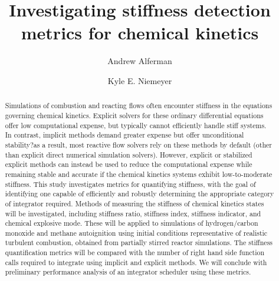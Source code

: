 \documentclass[12pt]{ussci}
\title{ Investigating stiffness detection metrics for chemical kinetics }
\author[1]{Andrew Alferman}
\author[1,*]{Kyle E. Niemeyer}
\affil[1]{School of Mechanical, Industrial, and Manufacturing Engineering\\
		Oregon State University, Corvallis, OR 97331, USA}
\affil[*]{Corresponding author: \email{Kyle.Niemeyer@oregonstate.edu}}
\begin{document}
\maketitle

\begin{abstract} %


Simulations of combustion and reacting flows often encounter stiffness in the equations governing chemical kinetics.
Explicit solvers for these ordinary differential equations offer low computational expense, but typically cannot efficiently handle stiff systems.
In contrast, implicit methods demand greater expense but offer unconditional stability?as a result, most reactive flow solvers rely on these methods by default (other than explicit direct numerical simulation solvers).
However, explicit or stabilized explicit methods can instead be used to reduce the computational expense while remaining stable and accurate if the chemical kinetics systems exhibit low-to-moderate stiffness.
This study investigates metrics for quantifying stiffness, with the goal of identifying one capable of efficiently and robustly determining the appropriate category of integrator required.
Methods of measuring the stiffness of chemical kinetics states will be investigated, including stiffness ratio, stiffness index, stiffness indicator, and chemical explosive mode.
These will be applied to simulations of hydrogen/carbon monoxide and methane autoignition using initial conditions representative of realistic turbulent combustion, obtained from partially stirred reactor simulations.
The stiffness quantification metrics will be compared with the number of right hand side function calls required to integrate using implicit and explicit methods.
We will conclude with preliminary performance analysis of an integrator scheduler using these metrics.

\end{abstract}
\end{document}
